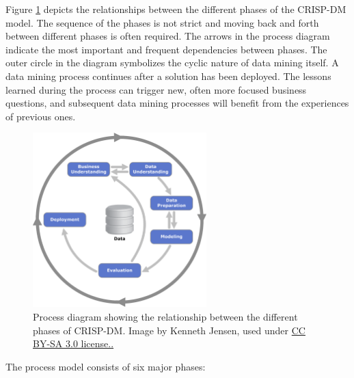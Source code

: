 Figure \ref{fig:crisp-dm} depicts the relationships between the different phases of the CRISP-DM model. The sequence of the phases is not strict and moving back and forth between different phases is often required. The arrows in the process diagram indicate the most important and frequent dependencies between phases. The outer circle in the diagram symbolizes the cyclic nature of data mining itself. A data mining process continues after a solution has been deployed. The lessons learned during the process can trigger new, often more focused business questions, and subsequent data mining processes will benefit from the experiences of previous ones.

\begin{figure}[hpt]
	\centering
	\includegraphics[width=0.6\textwidth]{figs/ch1/crisp-dm.png}
	\caption{Process diagram showing the relationship between the different phases of CRISP-DM. Image by Kenneth Jensen, used under \href{https://creativecommons.org/licenses/by/2.0/}{CC BY-SA 3.0 license..}}
	\label{fig:crisp-dm}
\end{figure}

The process model consists of six major phases:

